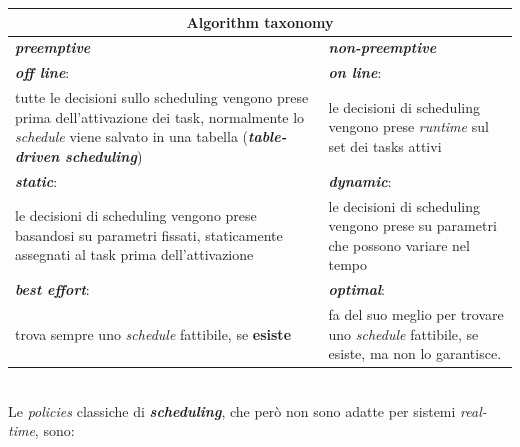 \begin{tabular}{ |p{7.25cm}|p{7.25cm}| }
    \hline
    \multicolumn{2}{|c|}{\textbf{Algorithm taxonomy}} \\
    \hline
    \textbf{\textit{preemptive}} & \textbf{\textit{non-preemptive}} \\
    \hline
    \textbf{\textit{off line}}: & \textbf{\textit{on line}}: \\
    tutte le decisioni sullo scheduling vengono prese prima dell'attivazione dei task, normalmente lo \textit{schedule} viene salvato in una tabella (\textbf{\textit{table-driven scheduling}}) & le decisioni di scheduling vengono prese \textit{runtime} sul set dei tasks attivi \\ \hline
    \textbf{\textit{static}}: & \textbf{\textit{dynamic}}: \\
    le decisioni di scheduling vengono prese basandosi su parametri fissati, staticamente assegnati al task prima dell'attivazione & le decisioni di scheduling vengono prese su parametri che possono variare nel tempo \\ \hline
    \textbf{\textit{best effort}}: & \textbf{\textit{optimal}}: \\
    trova sempre uno \textit{schedule} fattibile, se \textbf{esiste} & fa del suo meglio per trovare uno \textit{schedule} fattibile, se esiste, ma non lo garantisce. \\ \hline
\end{tabular}
\\ \newline
Le \textit{policies} classiche di \textbf{\textit{scheduling}}, che però non sono adatte per sistemi \textit{real-time}, sono:
